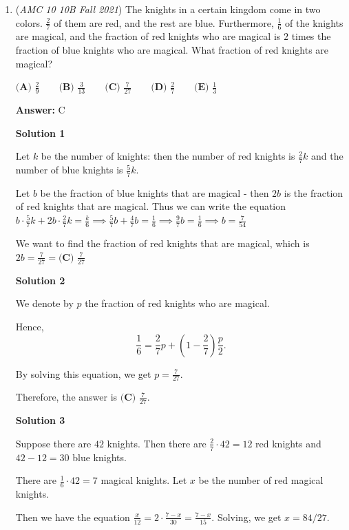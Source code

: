 \begin{enumerate}
 


	\item (\textit{AMC 10 10B Fall 2021}) The knights in a certain kingdom come in two colors. $\frac{2}{7}$ of them are red, and the rest are blue. Furthermore, $\frac{1}{6}$ of the knights are magical, and the fraction of red knights who are magical is $2$ times the fraction of blue knights who are magical. What fraction of red knights are magical?


 $\textbf{(A) }\frac{2}{9}\qquad\textbf{(B) }\frac{3}{13}\qquad\textbf{(C) }\frac{7}{27}\qquad\textbf{(D) }\frac{2}{7}\qquad\textbf{(E) }\frac{1}{3}$

 \textbf{Answer: }C



\textbf{Solution 1}

Let $k$ be the number of knights: then the number of red knights is $\frac{2}{7}k$ and the number of blue knights is $\frac{5}{7}k$.

 Let $b$ be the fraction of blue knights that are magical - then $2b$ is the fraction of red knights that are magical. Thus we can write the equation $b \cdot \frac{5}{7}k + 2b \cdot \frac{2}{7}k = \frac{k}{6}\implies \frac{5}{7}b + \frac{4}{7}b = \frac{1}{6}$$\implies \frac{9}{7}b = \frac{1}{6} \implies b=\frac{7}{54}$

 We want to find the fraction of red knights that are magical, which is $2b = \frac{7}{27} = \boxed{\textbf{(C) }\frac{7}{27}}$




\textbf{Solution 2}

We denote by $p$ the fraction of red knights who are magical.

 Hence,
 \[ \frac{1}{6} = \frac{2}{7} p + \left( 1 - \frac{2}{7} \right) \frac{p}{2} . \]

 By solving this equation, we get $p = \frac{7}{27}$.

 Therefore, the answer is $\boxed{\textbf{(C) }\frac{7}{27}}$.

 



\textbf{Solution 3}

Suppose there are $42$ knights. Then there are $\frac{2}{7}\cdot 42=12$ red knights and $42-12=30$ blue knights. 

 There are $\frac{1}{6}\cdot 42=7$ magical knights. Let $x$ be the number of red magical knights. 

 Then we have the equation $\frac{x}{12}=2\cdot \frac{7-x}{30}=\frac{7-x}{15}$. Solving, we get $x=84/27$. 


\end{enumerate}
